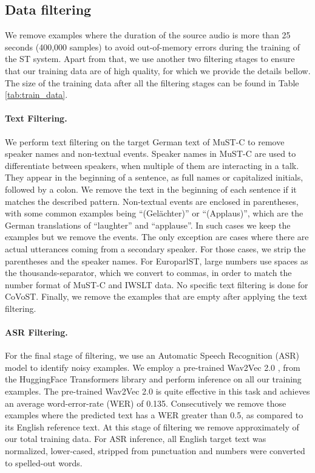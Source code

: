 \documentclass[11pt,a4paper]{article}
\begin{document}
    \subsection{Data filtering} \label{sec:filtering}
        
        We remove examples where the duration of the source audio is more than 25 seconds (400,000 samples) to avoid out-of-memory errors during the training of the ST system. Apart from that, we use another two filtering stages to ensure that our training data are of high quality, for which we provide the details bellow. The size of the training data after all the filtering stages can be found in Table \ref{tab:train_data}.
        
        \paragraph{Text Filtering.} We perform text filtering on the target German text of MuST-C to remove speaker names and non-textual events. Speaker names in MuST-C are used to differentiate between speakers, when multiple of them are interacting in a talk. They appear in the beginning of a sentence, as full names or capitalized initials, followed by a colon. We remove the text in the beginning of each sentence if it matches the described pattern. Non-textual events are enclosed in parentheses, with some common examples being “(Gelächter)” or “(Applaus)”, which are the German translations of “laughter” and “applause”. In such cases we keep the examples but we remove the events. The only exception are cases where there are actual utterances coming from a secondary speaker. For those cases, we strip the parentheses and the speaker names. For EuroparlST, large numbers use spaces as the thousands-separator, which we convert to commas, in order to match the number format of MuST-C and IWSLT data. No specific text filtering is done for CoVoST. Finally, we remove the examples that are empty after applying the text filtering.
        
        \paragraph{ASR Filtering.} For the final stage of filtering, we use an Automatic Speech Recognition (ASR) model to identify noisy examples. We employ a pre-trained Wav2Vec 2.0 \cite{wav2vec2.0}, from the HuggingFace Transformers library \cite{transformers} and perform inference on all our training examples. The pre-trained Wav2Vec 2.0 is quite effective in this task and achieves an average word-error-rate (WER) of 0.135. Consecutively we remove those examples where the predicted text has a WER greater than 0.5, as compared to its English reference text. At this stage of filtering we remove approximately  of our total training data. For ASR inference, all English target text was normalized, lower-cased, stripped from punctuation and numbers were converted to spelled-out words. 
\end{document}
